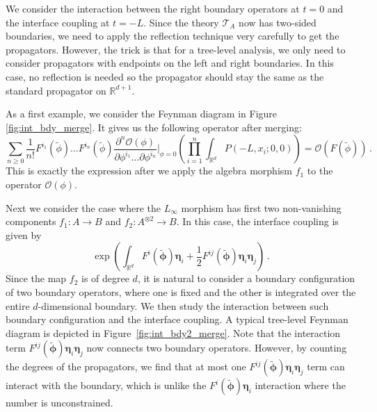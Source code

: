 \documentclass[11pt]{article}
\numberwithin{equation}{section}
\begin{document}
We consider the interaction between the right boundary operators at $t = 0$ and the interface coupling at $t = -L$. Since the theory $\mathcal{T}_A$ now has two-sided boundaries, we need to apply the reflection technique very carefully to get the propagators. However, the trick is that for a tree-level analysis, we only need to consider propagators with endpoints on the left and right boundaries. In this case, no reflection is needed so the propagator should stay the same as the standard propagator on $\mathbb{R}^{d+1}$. 

As a first example, we consider the Feynman diagram in Figure \ref{fig:int_bdy_merge}. It gives us the following operator after merging:
\begin{equation}
	\sum_{n\geq 0}\frac{1}{n!}F^{i_1}(\widetilde{\phi})\dots F^{i_n}(\widetilde{\phi})\frac{\partial^n \mathcal{O}(\phi)}{\partial \phi^{i_1} \dots \partial \phi^{i_n}}\Big|_{\phi=0} \left(\prod_{i=1}^n\int_{\mathbb{R}^d} P(-L,x_i;0,0)\right)= \mathcal{O}(F(\widetilde{\phi}))\,.
\end{equation}
This is exactly the expression after we apply the algebra morphism $f_1$ to the operator $\mathcal{O}(\phi)$.


Next we consider the case where the $L_\infty$ morphism has first two non-vanishing components $f_1:A \to B$ and $f_2: A^{\otimes 2} \to B$. In this case, the interface coupling is given by
\begin{equation}
\exp\left(\int_{\mathbb{R}^d}F^i(\widetilde{\boldsymbol{\phi}})\boldsymbol{\eta}_i + \frac{1}{2}F^{ij}(\widetilde{\boldsymbol{\phi}})\boldsymbol{\eta}_i\boldsymbol{\eta}_j\right)\,.
\end{equation}
Since the map $f_2$ is of degree $d$, it is natural to consider a boundary configuration of two boundary operators, where one is fixed and the other is integrated over the entire $d$-dimensional boundary. We then study the interaction between such boundary configuration and the interface coupling. A typical tree-level Feynman diagram is depicted in Figure~\ref{fig:int_bdy2_merge}. Note that the interaction term $F^{ij}(\widetilde{\boldsymbol{\phi}})\boldsymbol{\eta}_i\boldsymbol{\eta}_j$ now connects two boundary operators. However, by counting the degrees of the propagators, we find that at most one $F^{ij}(\widetilde{\boldsymbol{\phi}})\boldsymbol{\eta}_i\boldsymbol{\eta}_j$ term can interact with the boundary, which is unlike the $F^i(\widetilde{\boldsymbol{\phi}})\boldsymbol{\eta}_i$ interaction where the number is unconstrained.
\end{document}
